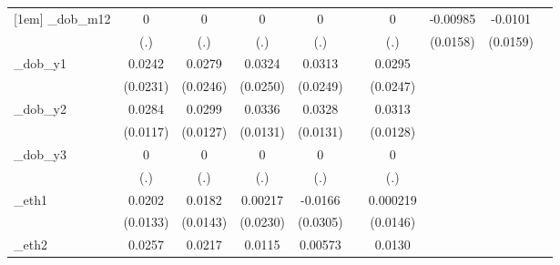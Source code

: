 \begin{table}[htbp]
\begin{tabular}{l*{9}{c}}
[1em]
\_dob\_m12    &           0         &           0         &           0         &           0         &                     &           0         &    -0.00985         &     -0.0101         &                     \\
            &         (.)         &         (.)         &         (.)         &         (.)         &                     &         (.)         &    (0.0158)         &    (0.0159)         &                     \\
[1em]
\_dob\_y1     &      0.0242         &      0.0279         &      0.0324         &      0.0313         &                     &      0.0295         &                     &                     &                     \\
            &    (0.0231)         &    (0.0246)         &    (0.0250)         &    (0.0249)         &                     &    (0.0247)         &                     &                     &                     \\
[1em]
\_dob\_y2     &      0.0284\sym{**} &      0.0299\sym{**} &      0.0336\sym{**} &      0.0328\sym{**} &                     &      0.0313\sym{**} &                     &                     &                     \\
            &    (0.0117)         &    (0.0127)         &    (0.0131)         &    (0.0131)         &                     &    (0.0128)         &                     &                     &                     \\
[1em]
\_dob\_y3     &           0         &           0         &           0         &           0         &                     &           0         &                     &                     &                     \\
            &         (.)         &         (.)         &         (.)         &         (.)         &                     &         (.)         &                     &                     &                     \\
[1em]
\_eth1       &      0.0202         &      0.0182         &     0.00217         &     -0.0166         &                     &    0.000219         &                     &                     &                     \\
            &    (0.0133)         &    (0.0143)         &    (0.0230)         &    (0.0305)         &                     &    (0.0146)         &                     &                     &                     \\
[1em]
\_eth2       &      0.0257\sym{***}&      0.0217\sym{**} &      0.0115         &     0.00573         &                     &      0.0130         &                     &                     &                     \\

\end{tabular}
\end{table}
